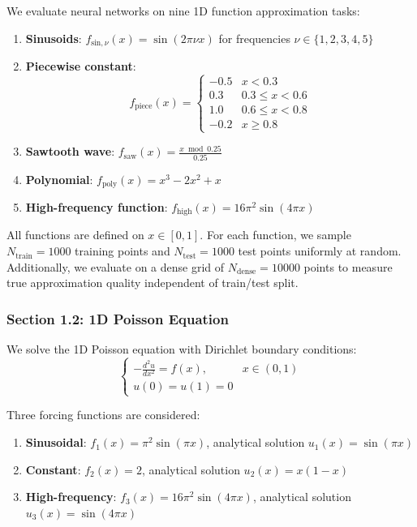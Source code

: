\documentclass[11pt,a4paper]{article}
\begin{document}
We evaluate neural networks on nine 1D function approximation tasks:
\begin{enumerate}
    \item \textbf{Sinusoids}: $f_{\text{sin},\nu}(x) = \sin(2\pi \nu x)$ for frequencies $\nu \in \{1,2,3,4,5\}$
    \item \textbf{Piecewise constant}:
    \begin{equation}
    f_{\text{piece}}(x) = \begin{cases}
    -0.5 & x < 0.3 \\
    0.3 & 0.3 \le x < 0.6 \\
    1.0 & 0.6 \le x < 0.8 \\
    -0.2 & x \ge 0.8
    \end{cases}
    \end{equation}
    \item \textbf{Sawtooth wave}: $f_{\text{saw}}(x) = \frac{x \bmod 0.25}{0.25}$
    \item \textbf{Polynomial}: $f_{\text{poly}}(x) = x^3 - 2x^2 + x$
    \item \textbf{High-frequency function}: $f_{\text{high}}(x) = 16\pi^2 \sin(4\pi x)$
\end{enumerate}

All functions are defined on $x \in [0,1]$. For each function, we sample $N_{\text{train}} = 1000$ training points and $N_{\text{test}} = 1000$ test points uniformly at random. Additionally, we evaluate on a dense grid of $N_{\text{dense}} = 10000$ points to measure true approximation quality independent of train/test split.

\subsubsection{Section 1.2: 1D Poisson Equation}

We solve the 1D Poisson equation with Dirichlet boundary conditions:
\begin{equation}
\begin{cases}
-\frac{d^2 u}{dx^2} = f(x), & x \in (0,1) \\
u(0) = u(1) = 0
\end{cases}
\end{equation}

Three forcing functions are considered:
\begin{enumerate}
    \item \textbf{Sinusoidal}: $f_1(x) = \pi^2 \sin(\pi x)$, analytical solution $u_1(x) = \sin(\pi x)$
    \item \textbf{Constant}: $f_2(x) = 2$, analytical solution $u_2(x) = x(1-x)$
    \item \textbf{High-frequency}: $f_3(x) = 16\pi^2 \sin(4\pi x)$, analytical solution $u_3(x) = \sin(4\pi x)$
\end{enumerate}
\end{document}
